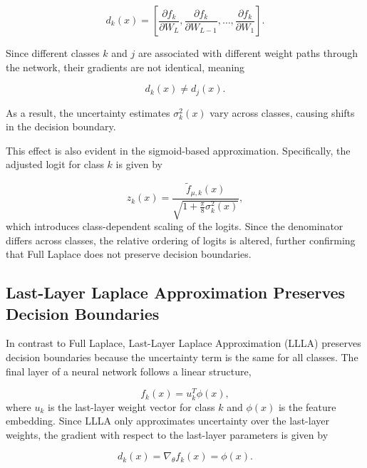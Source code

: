 \documentclass{article}
\begin{document}
\begin{equation}
    d_k(x) = \left[ \frac{\partial f_k}{\partial W_L}, \frac{\partial f_k}{\partial W_{L-1}}, \dots, \frac{\partial f_k}{\partial W_1} \right].
\end{equation}

Since different classes \( k \) and \( j \) are associated with different weight paths through the network, their gradients are not identical, meaning

\begin{equation}
    d_k(x) \neq d_j(x).
\end{equation}

As a result, the uncertainty estimates \( \sigma_k^2(x) \) vary across classes, causing shifts in the decision boundary.

This effect is also evident in the sigmoid-based approximation. Specifically, the adjusted logit for class \( k \) is given by

\begin{equation}
    z_k(x) = \frac{\tilde{f}_{\mu,k}(x)}{\sqrt{1 + \frac{\pi}{8} \sigma_k^2(x)}},
\end{equation}
which introduces class-dependent scaling of the logits. Since the denominator differs across classes, the relative ordering of logits is altered, further confirming that Full Laplace does not preserve decision boundaries.

\subsection{Last-Layer Laplace Approximation Preserves Decision Boundaries}

In contrast to Full Laplace, Last-Layer Laplace Approximation (LLLA) preserves decision boundaries because the uncertainty term is the same for all classes. The final layer of a neural network follows a linear structure,

\begin{equation}
    f_k(x) = u_k^T \phi(x),
\end{equation}
where \( u_k \) is the last-layer weight vector for class \( k \) and \( \phi(x) \) is the feature embedding. Since LLLA only approximates uncertainty over the last-layer weights, the gradient with respect to the last-layer parameters is given by

\begin{equation}
    d_k(x) = \nabla_{\theta} f_k(x) = \phi(x).
\end{equation}
\end{document}
